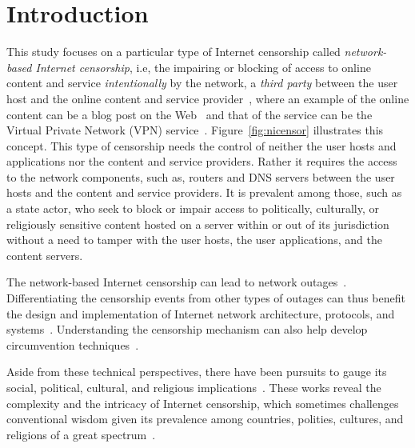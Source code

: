 \section{Introduction}
\label{sec:intro}

This study focuses on a particular type of Internet censorship called {\em
network-based Internet censorship}, i.e, the impairing or blocking of access to
online content and service {\em intentionally} by the network, a {\em third
party} between the user host and the online content and service
provider~\cite{aceto_internet_2015}, where an example of the online content can
be a blog post on the Web~\cite{zhu2013velocity} and that of the service can be
the Virtual Private Network (VPN) service~\cite{xue280012}.
Figure~\ref{fig:nicensor} illustrates this concept. This type of censorship
needs the control of neither the user hosts and applications nor the content and
service providers.  Rather it requires the access to the network components, such
as, routers and DNS servers between the user hosts and the content and service
providers. It is prevalent among those, such as a state actor, who seek to
block or impair access to politically, culturally, or religiously sensitive content
hosted on a server within or out of its jurisdiction without a need to tamper
with  the user hosts, the user applications, and the content servers.  

The network-based Internet censorship can lead to network
outages~\cite{dainotti2011analysis}.  Differentiating the censorship events
from other types of outages can thus benefit the design and implementation of
Internet network architecture, protocols, and
systems~\cite{aceto2018comprehensive, aceto_internet_2015}.  Understanding the
censorship mechanism can also help develop circumvention
techniques~\cite{winter2012great, chai2019importance, satija2021blindtls}.

Aside from these technical perspectives, there have been pursuits to gauge its
social, political, cultural, and religious
implications~\cite{shishkina2018internet, meserve2018google,
chen2000pornography}. These works reveal the complexity and the intricacy of Internet censorship, which sometimes challenges conventional wisdom
given its prevalence among countries, polities, cultures, and religions 
of a great spectrum~\cite{aryan2013internet, nabi2013anatomy, singh2017characterizing,
yadav2018light, ng2018detecting,
meserve2018google, bock2021even, padmanabhan2021multi, ververis2021understanding}.

